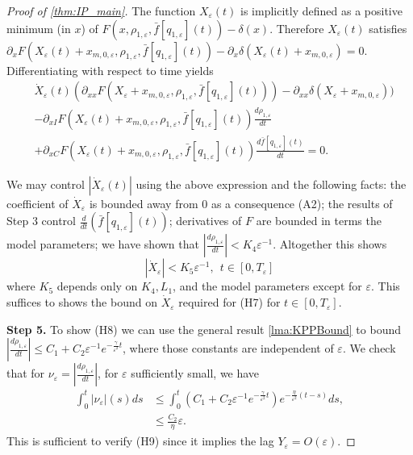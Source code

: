 \documentclass[]{article}
\theoremstyle{remark}
\begin{document}
\begin{proof}[{Proof of \cref{thm:IP_main}}]
The function ${X}_\varepsilon(t)$ is implicitly defined as a positive minimum (in $x$) of $F(x,\rho_{1,\varepsilon},\bar{f}[q_{1,\varepsilon}](t))-\delta(x)$.
Therefore $X_\varepsilon(t)$ satisfies 
$\partial_{x}F(X_\varepsilon(t)+x_{m,0,\varepsilon},\rho_{1,\varepsilon},\bar{f}[q_{1,\varepsilon}](t))-\partial_{x}\delta(X_\varepsilon(t)+x_{m,0,\varepsilon})=0.$ Differentiating with respect to time yields
\begin{align*}
&\dot{X}_\varepsilon(t)(\partial_{xx}F(X_\varepsilon+x_{m,0,\varepsilon},\rho_{1,\varepsilon},\bar{f}[q_{1,\varepsilon}](t)))-\partial_{xx}\delta(X_\varepsilon+x_{m,0,\varepsilon}))\\
&-\partial_{xI}F(X_\varepsilon(t)+x_{m,0,\varepsilon},\rho_{1,\varepsilon},\bar{f}[q_{1,\varepsilon}](t))\frac{d\rho_{1,\varepsilon}}{dt}\\
&+\partial_{xC}F(X_\varepsilon(t)+x_{m,0,\varepsilon},\rho_{1,\varepsilon},\bar{f}[q_{1,\varepsilon}](t))\frac{d\bar{f}[q_{1,\varepsilon}](t)}{dt}=0.
\end{align*}


We may control $|\dot{X}_\varepsilon(t)|$ using the above expression and the following facts: the coefficient of $\dot{X}_\varepsilon$ is bounded away from $0$ as a consequence (A2); the results of Step 3  control  $\frac{d}{dt}(\bar{f}[q_{1,\varepsilon}](t))$; derivatives of $F$ are bounded in terms the model parameters; we have shown that $\left\vert\frac{d\rho_{1,\varepsilon}}{dt}\right\vert<K_4\varepsilon^{-1}$.  Altogether this shows 
\[|\dot{X}_\varepsilon|<K_5\varepsilon^{-1},~~t\in[0,T_\varepsilon]\] where $K_5$ depends only on $K_4,L_1$, and the model parameters except for $\varepsilon$. This suffices to shows the bound on $\dot{X}_\varepsilon$ required for (H7) for $t\in[0,T_\varepsilon]$.

\textbf{Step 5.}
To show  (H8) we can use the general result \cref{lma:KPPBound} to bound $\left\vert\frac{d\rho_{1,\varepsilon}}{dt}\right\vert\leq{}C_1+C_2\varepsilon^{-1}e^{-\frac{\gamma}{\varepsilon^2}t}$, where those constants are independent of $\varepsilon$.  We check that for $\nu_\varepsilon=\left\vert\frac{d\rho_{1,\varepsilon}}{dt}\right\vert$, for $\varepsilon$ sufficiently small, we have
\begin{align*}
\int_{0}^{t}|\nu_\varepsilon|(s)ds&\leq{}\int_{0}^{t}(C_1+C_2\varepsilon^{-1}e^{-\frac{\gamma}{\varepsilon^2}t})e^{-\frac{\eta}{\varepsilon^2}(t-s)}ds,\\
    &\leq{}\frac{C_2}{\eta}\varepsilon.
\end{align*}
This is sufficient to verify (H9) since it implies the lag $Y_\varepsilon=O(\varepsilon)$.


\end{proof}
\end{document}
